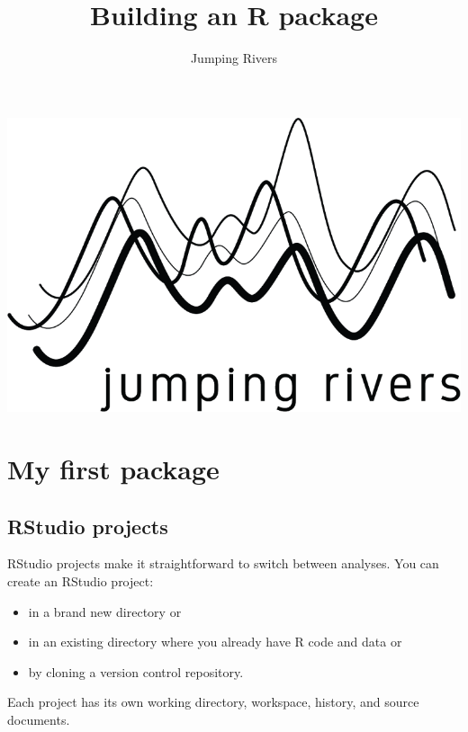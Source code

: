 \documentclass[a4paper,justified,openany]{tufte-handout}\usepackage[]{graphicx}\usepackage[]{color}
\title{Building an R package}
\author[Jumping Rivers]{Jumping Rivers}
\date{}  %
\begin{document}
\maketitle%
\begin{marginfigure}
\centering
\includegraphics[]{logo.png}
\end{marginfigure}
\section{My first package}

\subsection{RStudio projects}

RStudio projects make it straightforward to switch between analyses. You can
create an RStudio project:
\begin{itemize}
\item in a brand new directory or
\item in an existing directory where you already have R code and data or
\item by cloning a version control repository.
\end{itemize}
Each project has its own working directory, workspace, history, and source
documents.
\end{document}

